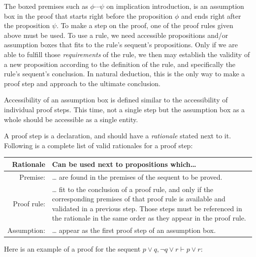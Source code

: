 \documentclass{article}
\newcommand{\seq}{\ensuremath{\vdash}}
\begin{document}
The boxed premises such as $\boxed{\phi \dotsb \psi}$ on
implication introduction, is an assumption box in the proof
that starts right before the proposition $\phi$ and ends right
after the proposition $\psi$. 
To make a step on the proof, one of the proof rules given
above must be used. To use a rule, we need accessible propositions
and/or assumption boxes that fits to the rule's sequent's propositions.
Only if we are able to fulfill those \textit{requirements} of the rule,
we then may establish the validity of a new proposition according
to the definition of the rule, and specifically the rule's sequent's
conclusion. In natural deduction, this is the only way to
make a proof step and approach to the ultimate conclusion.

Accessibility of an assumption box is defined similar to the
accessibility of individual proof steps. This time, not a single
step but the assumption box as a whole should be accessible as a
single entity.

A proof step is a declaration, and should have a \textit{rationale}
stated next to it. Following is a complete list of valid rationales
for a proof step:
\begin{center}
	\begin{tabular}{r | p{37em}}
		\textbf{Rationale} & \textbf{Can be used next to propositions which\ldots{}}\\\hline
		Premise: & \ldots{} are found in the premises of the sequent
			to be proved.\\
		Proof rule: & \ldots{} fit to the conclusion of a proof rule,
			and only if the corresponding premises of that proof rule
			is available and validated in a previous step. Those steps
			must be referenced in the rationale in the
			same order as they appear in the proof rule.\\
		Assumption: & \ldots{} appear as the first proof step of an
			assumption box.
	\end{tabular}
\end{center}

Here is an example of a proof for the sequent
$p \lor q, \neg q \lor r \seq p \lor r$:
\end{document}
